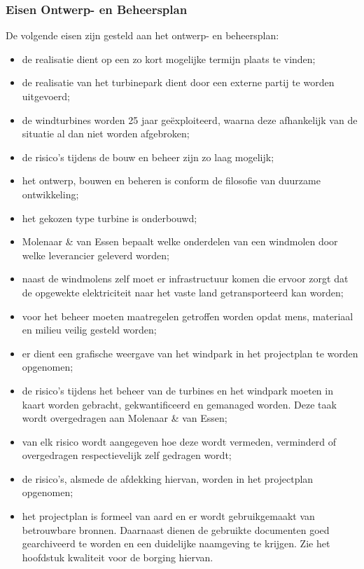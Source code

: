 \documentclass[numbers=endperiod]{scrartcl}
\begin{document}
	\subsubsection{Eisen Ontwerp- en Beheersplan}
	De volgende eisen zijn gesteld aan het ontwerp- en beheersplan:
	\begin{itemize}
		\item de realisatie dient op een zo kort mogelijke termijn plaats te vinden;
		\item de realisatie van het turbinepark dient door een externe partij te worden uitgevoerd;
		\item de windturbines worden 25 jaar geëxploiteerd, waarna deze afhankelijk van de situatie al dan niet worden afgebroken;
		\item de risico's tijdens de bouw en beheer zijn zo laag mogelijk;
		\item het ontwerp, bouwen en beheren is conform de filosofie van duurzame ontwikkeling;
		\item het gekozen type turbine is onderbouwd;
		\item Molenaar \& van Essen bepaalt welke onderdelen van een windmolen door welke leverancier geleverd worden;
		\item naast de windmolens zelf moet er infrastructuur komen die ervoor zorgt dat de opgewekte elektriciteit naar het vaste land getransporteerd kan worden;
		\item voor het beheer moeten maatregelen getroffen worden opdat mens, materiaal en milieu veilig gesteld worden;
		\item er dient een grafische weergave van het windpark in het projectplan te worden opgenomen;
		\item de risico’s tijdens het beheer van de turbines en het windpark moeten in kaart worden gebracht, gekwantificeerd en gemanaged worden. Deze taak wordt overgedragen aan Molenaar \& van Essen;
		\item van elk risico wordt aangegeven hoe deze wordt vermeden, verminderd of overgedragen respectievelijk zelf gedragen wordt;
		\item de risico's, alsmede de afdekking hiervan, worden in het projectplan opgenomen;
		\item het projectplan is formeel van aard en er wordt gebruikgemaakt van betrouwbare bronnen. Daarnaast dienen de gebruikte documenten goed gearchiveerd te worden en een duidelijke naamgeving te krijgen. Zie het hoofdstuk kwaliteit voor de borging hiervan. 
	\end{itemize}
	
\end{document}
